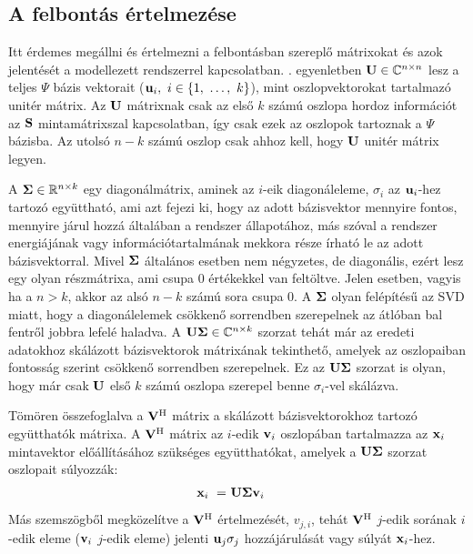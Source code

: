         \subsection{A felbontás értelmezése}
            Itt érdemes megállni és értelmezni a felbontásban szereplő mátrixokat és azok jelentését a modellezett rendszerrel kapcsolatban. . egyenletben ${\bf U} \in \mathbb{C}^{n\times n}$ lesz a teljes $\Psi$ bázis vektorait (${\bf u}_i,~i \in \{1,~\hdots,~k\}$), mint oszlopvektorokat tartalmazó unitér mátrix. Az ${\bf U}$ mátrixnak csak az első $k$ számú oszlopa hordoz információt az ${\bf S}$ mintamátrixszal kapcsolatban, így csak ezek az oszlopok tartoznak a $\Psi$ bázisba. Az utolsó $n-k$ számú oszlop csak ahhoz kell, hogy ${\bf U}$ unitér mátrix legyen.
            \par
            A ${\bf \Sigma} \in \mathbb{R}^{n\times k}$ egy diagonálmátrix, aminek az $i$-eik diagonáleleme, $\sigma_i$ az ${\bf u}_i$-hez tartozó együttható, ami azt fejezi ki, hogy az adott bázisvektor mennyire fontos, mennyire járul hozzá általában a rendszer állapotához, más szóval a rendszer energiájának vagy információtartalmának mekkora része írható le az adott bázisvektorral. Mivel ${\bf \Sigma}$ általános esetben nem négyzetes, de diagonális, ezért lesz egy olyan részmátrixa, ami csupa 0 értékekkel van feltöltve. Jelen esetben, vagyis ha a $n > k$, akkor az alsó $n-k$ számú sora csupa 0. A ${\bf \Sigma}$ olyan felépítésű az SVD miatt, hogy a diagonálelemek csökkenő sorrendben szerepelnek az átlóban bal fentről jobbra lefelé haladva. A ${\bf U\Sigma} \in \mathbb{C}^{n\times k}$ szorzat tehát már az eredeti adatokhoz skálázott bázisvektorok mátrixának tekinthető, amelyek az oszlopaiban fontosság szerint csökkenő sorrendben szerepelnek. Ez az ${\bf U\Sigma}$ szorzat is olyan, hogy már csak ${\bf U}$ első $k$ számú oszlopa szerepel benne $\sigma_i$-vel skálázva.
            \par
            Tömören összefoglalva a ${\bf V^{\mathrm{H}}}$ mátrix a skálázott bázisvektorokhoz tartozó együtthatók mátrixa. A ${\bf V^{\mathrm{H}}}$ mátrix az $i$-edik ${\bf v}_i$ oszlopában tartalmazza az ${\bf x}_i$ mintavektor előállításához szükséges együtthatókat, amelyek a ${\bf U\Sigma}$ szorzat oszlopait súlyozzák:
            \begin{align}
                {\bf x}_i~=&~{\bf U\Sigma v}_i
            \end{align}
            Más szemszögből megközelítve a ${\bf V^{\mathrm{H}}}$ értelmezését, $v_{j,i}$, tehát ${\bf V^{\mathrm{H}}}$ $j$-edik sorának $i$-edik eleme (${\bf v}_i$ $j$-edik eleme) jelenti ${\bf u}_j \sigma_j$ hozzájárulását vagy súlyát ${\bf x}_i$-hez.
